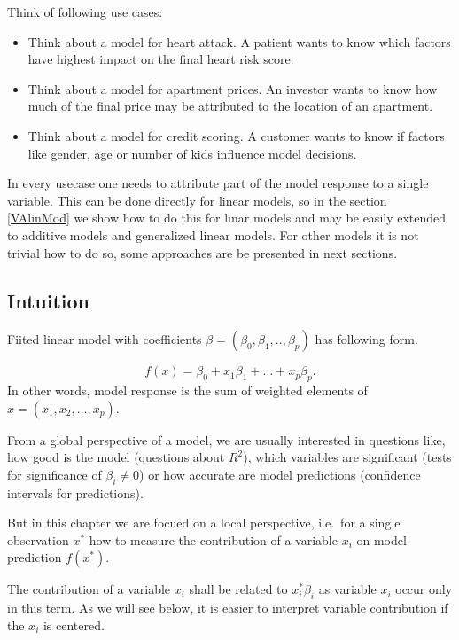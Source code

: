 \documentclass[]{krantz}
\providecommand{\tightlist}{%
  \setlength{\itemsep}{0pt}\setlength{\parskip}{0pt}}
\theoremstyle{definition}
\theoremstyle{definition}
\theoremstyle{definition}
\theoremstyle{remark}
\begin{document}
Think of following use cases:

\begin{itemize}
\tightlist
\item
  Think about a model for heart attack. A patient wants to know which
  factors have highest impact on the final heart risk score.
\item
  Think about a model for apartment prices. An investor wants to know
  how much of the final price may be attributed to the location of an
  apartment.
\item
  Think about a model for credit scoring. A customer wants to know if
  factors like gender, age or number of kids influence model decisions.
\end{itemize}

In every usecase one needs to attribute part of the model response to a
single variable. This can be done directly for linear models, so in the
section \ref{VAlinMod} we show how to do this for linar models and may
be easily extended to additive models and generalized linear models. For
other models it is not trivial how to do so, some approaches are be
presented in next sections.

\hypertarget{intuition}{%
\subsection{Intuition}\label{intuition}}

Fiited linear model with coefficients
\(\beta = (\beta_0, \beta_1, .., \beta_p)\) has following form.

\[
f(x) = \beta_0 + x_1 \beta_1 + \ldots + x_p \beta_p.
\] In other words, model response is the sum of weighted elements of
\(x = (x_1, x_2, \ldots, x_p)\).

From a global perspective of a model, we are usually interested in
questions like, how good is the model (questions about \(R^2\)), which
variables are significant (tests for significance of \(\beta_i \neq 0\))
or how accurate are model predictions (confidence intervals for
predictions).

But in this chapter we are focued on a local perspective, i.e.~for a
single observation \(x^*\) how to measure the contribution of a variable
\(x_i\) on model prediction \(f(x^*)\).

The contribution of a variable \(x_i\) shall be related to
\(x^*_i\beta_i\) as variable \(x_i\) occur only in this term. As we will
see below, it is easier to interpret variable contribution if the
\(x_i\) is centered.
\end{document}
